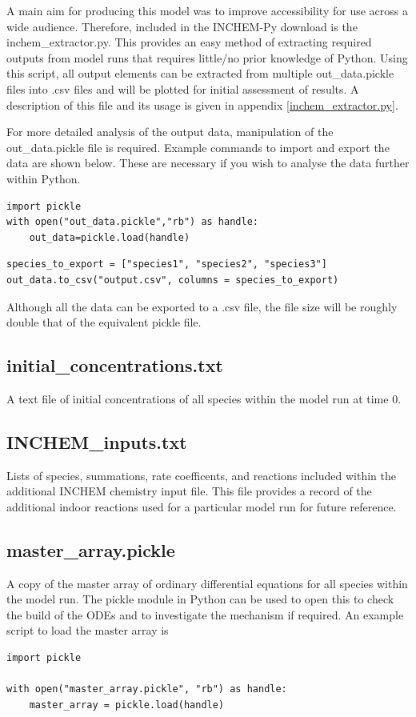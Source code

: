 \documentclass[a4paper]{refart}
\begin{document}
A main aim for producing this model was to improve accessibility for use across a wide audience. Therefore, included in the INCHEM-Py download is the inchem\_extractor.py. This provides an easy method of extracting required outputs from model runs that requires little/no prior knowledge of Python. Using this script, all output elements can be extracted from multiple out\_data.pickle files into .csv files and will be plotted for initial assessment of results. A description of this file and its usage is given in appendix \ref{inchem_extractor.py}. 


For more detailed analysis of the output data, manipulation of the out\_data.pickle file is required. Example commands to import and export the data are shown below. These are necessary if you wish to analyse the data further within Python.

\begin{verbatim}
import pickle
with open("out_data.pickle","rb") as handle:
    out_data=pickle.load(handle)
\end{verbatim}

\begin{verbatim}
species_to_export = ["species1", "species2", "species3"]
out_data.to_csv("output.csv", columns = species_to_export)
\end{verbatim}
Although all the data can be exported to a .csv file, the file size will be roughly double that of the equivalent pickle file. 

\subsection{initial\_concentrations.txt}
A text file of initial concentrations of all species within the model run at time 0.

\subsection{INCHEM\_inputs.txt}
Lists of species, summations, rate coefficents, and reactions included within the additional INCHEM chemistry input file. This file provides a record of the additional indoor reactions used for a particular model run for future reference.

\subsection{master\_array.pickle}
A copy of the master array of ordinary differential equations for all species within the model run. The pickle module in Python can be used to open this to check the build of the ODEs and to investigate the mechanism if required. An example script to load the master array is
\begin{verbatim}
import pickle
    
with open("master_array.pickle", "rb") as handle:
    master_array = pickle.load(handle)
\end{verbatim}
\end{document}
